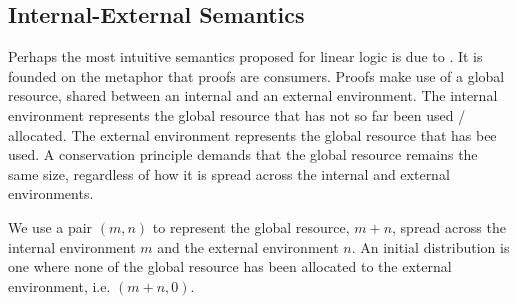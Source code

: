 \subsection{Internal-External Semantics}

Perhaps the most intuitive semantics proposed for linear logic is
due to .  It is founded on the metaphor that proofs
are consumers.  Proofs make use of a global resource, shared between
an internal and an external environment.  The internal environment
represents the global resource that has not so far been used /
allocated.  The external environment represents the global resource
that has bee used.  A conservation principle demands that the global
resource remains the same size, regardless of how it is spread across
the internal and external environments.

We use a pair $(m,n)$ to represent the global resource, $m+n$, spread
across the internal environment $m$ and the external environment $n$.
An initial distribution is one where none of the global resource has
been allocated to the external environment, i.e. $(m+n,0)$.

